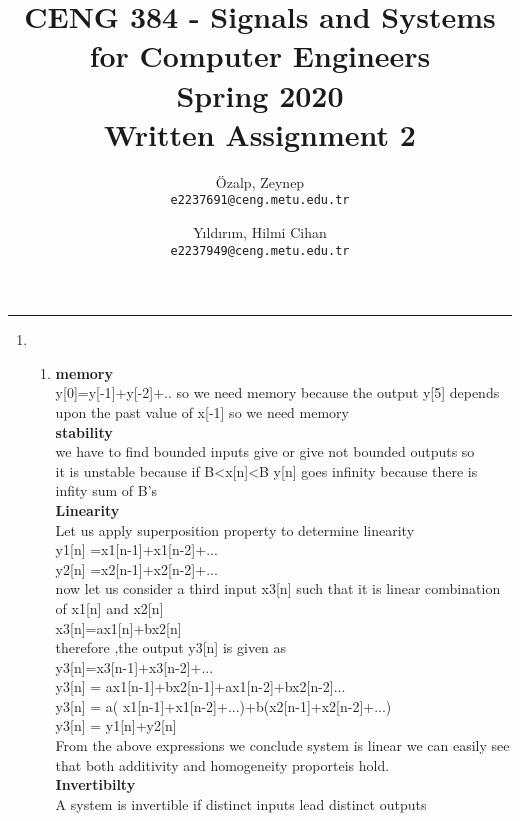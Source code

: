 \documentclass[10pt,a4paper, margin=1in]{article}
\author{
  Özalp, Zeynep\\
  \texttt{e2237691@ceng.metu.edu.tr}
  \and
  Yıldırım, Hilmi Cihan\\
  \texttt{e2237949@ceng.metu.edu.tr}
}
\title{CENG 384 - Signals and Systems for Computer Engineers \\
Spring 2020 \\
Written Assignment 2}
\begin{document}
\maketitle



\noindent\rule{19cm}{1.2pt}

\begin{enumerate}

\item %
    \begin{enumerate}
    \item %
    
   	\textbf{memory} \\
   	y[0]=y[-1]+y[-2]+.. so we need memory because the output y[5] depends upon the past value of x[-1] so we need memory\\
   	\textbf{stability} \\
   	we have to find bounded inputs give or give not bounded outputs so \\
   	it is unstable because if B<x[n]<B y[n] goes infinity because there is infity sum of B's 
   	\\
   		\textbf{Linearity} \\
   		Let us apply superposition property to determine linearity \\
   		y1[n] =x1[n-1]+x1[n-2]+...\\
   		y2[n] =x2[n-1]+x2[n-2]+... \\
	now let us consider a third input x3[n] such that it is linear combination of x1[n] and x2[n]  \\   	
		x3[n]=ax1[n]+bx2[n] \\ 
		therefore ,the output y3[n] is given as \\ 
		y3[n]=x3[n-1]+x3[n-2]+... \\
		y3[n] = ax1[n-1]+bx2[n-1]+ax1[n-2]+bx2[n-2]... \\ 
		y3[n] = a( x1[n-1]+x1[n-2]+...)+b(x2[n-1]+x2[n-2]+...) \\
		y3[n] = y1[n]+y2[n] \\ 
		From the above expressions we conclude system is linear we can easily see that  both additivity and homogeneity proporteis hold. \\
		\textbf{Invertibilty} \\
	A system is invertible if distinct inputs lead distinct outputs \\

\end{enumerate}
\end{enumerate}
\end{document}
